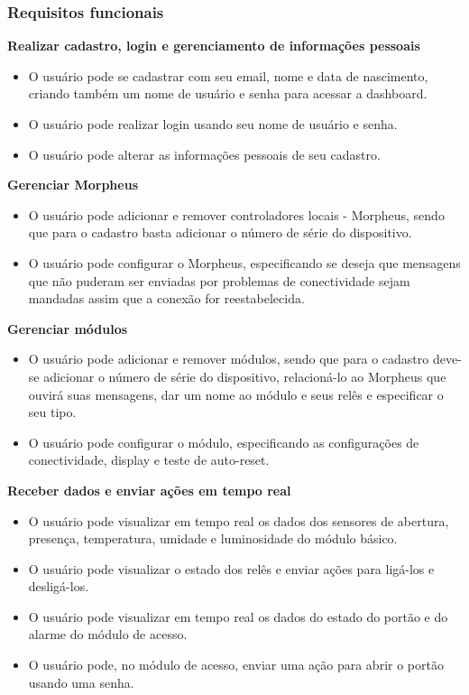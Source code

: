 \subsubsection{Requisitos funcionais}
\begin{description}

\item \textbf{Realizar cadastro, login e gerenciamento de informações pessoais}

\begin{itemize}
\item O usuário pode se cadastrar com seu email, nome e data de nascimento, criando também um nome de usuário e senha para acessar a dashboard.
\item O usuário pode realizar login usando seu nome de usuário e senha.
\item O usuário pode alterar as informações pessoais de seu cadastro.
\end{itemize}

\item \textbf{Gerenciar Morpheus}

\begin{itemize}
\item O usuário pode adicionar e remover controladores locais - Morpheus, sendo que para o cadastro basta adicionar o número de série do dispositivo.
\item O usuário pode configurar o Morpheus, especificando se deseja que mensagens que não puderam ser enviadas por problemas de conectividade sejam mandadas assim que a conexão for reestabelecida.
\end{itemize}

\item \textbf{Gerenciar módulos}

\begin{itemize}
\item O usuário pode adicionar e remover módulos, sendo que para o cadastro deve-se adicionar o número de série do dispositivo, relacioná-lo ao Morpheus que ouvirá suas mensagens, dar um nome ao módulo e seus relês e especificar o seu tipo.
\item O usuário pode configurar o módulo, especificando as configurações de conectividade, display e teste de auto-reset.
\end{itemize}

\item \textbf{Receber dados e enviar ações em tempo real}

\begin{itemize}
\item O usuário pode visualizar em tempo real os dados dos sensores de abertura, presença, temperatura, umidade e luminosidade do módulo básico.
\item O usuário pode visualizar o estado dos relês e enviar ações para ligá-los e desligá-los.
\item O usuário pode visualizar em tempo real os dados do estado do portão e do alarme do módulo de acesso.
\item O usuário pode, no módulo de acesso, enviar uma ação para abrir o portão usando uma senha.
\end{itemize}


\end{description}
